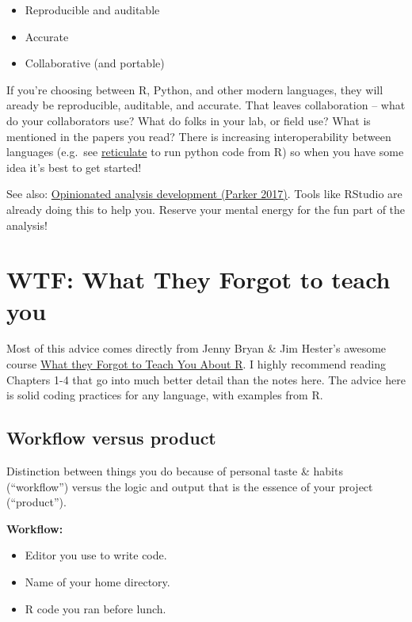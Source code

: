 \documentclass[
  letterpaper,
  DIV=11,
  numbers=noendperiod]{scrreprt}
\providecommand{\tightlist}{%
  \setlength{\itemsep}{0pt}\setlength{\parskip}{0pt}}
\begin{document}
\begin{itemize}
\tightlist
\item
  Reproducible and auditable
\item
  Accurate
\item
  Collaborative (and portable)
\end{itemize}

If you're choosing between R, Python, and other modern languages, they
will aready be reproducible, auditable, and accurate. That leaves
collaboration -- what do your collaborators use? What do folks in your
lab, or field use? What is mentioned in the papers you read? There is
increasing interoperability between languages (e.g.~see
\href{https://rstudio.github.io/reticulate/}{reticulate} to run python
code from R) so when you have some idea it's best to get started!

See also: \href{https://peerj.com/preprints/3210}{Opinionated analysis
development (Parker 2017)}. Tools like RStudio are already doing this to
help you. Reserve your mental energy for the fun part of the analysis!

\hypertarget{wtf-what-they-forgot-to-teach-you}{%
\section{WTF: What They Forgot to teach
you}\label{wtf-what-they-forgot-to-teach-you}}

Most of this advice comes directly from Jenny Bryan \& Jim Hester's
awesome course \href{https://whattheyforgot.org}{What they Forgot to
Teach You About R}. I highly recommend reading Chapters 1-4 that go into
much better detail than the notes here. The advice here is solid coding
practices for any language, with examples from R.

\hypertarget{workflow-versus-product}{%
\subsection{Workflow versus product}\label{workflow-versus-product}}

Distinction between things you do because of personal taste \& habits
(``workflow'') versus the logic and output that is the essence of your
project (``product'').

\textbf{Workflow:}

\begin{itemize}
\tightlist
\item
  Editor you use to write code.
\item
  Name of your home directory.
\item
  R code you ran before lunch.
\end{itemize}
\end{document}

